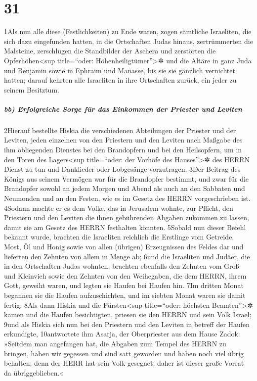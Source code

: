 \hypertarget{section-30}{%
\section{31}\label{section-30}}

1Als nun alle diese (Festlichkeiten) zu Ende waren, zogen sämtliche
Israeliten, die sich dazu eingefunden hatten, in die Ortschaften Judas
hinaus, zertrümmerten die Malsteine, zerschlugen die Standbilder der
Aschera und zerstörten die Opferhöhen\textless sup title=``oder:
Höhenheiligtümer''\textgreater✲ und die Altäre in ganz Juda und Benjamin
sowie in Ephraim und Manasse, bis sie sie gänzlich vernichtet hatten;
darauf kehrten alle Israeliten in ihre Ortschaften zurück, ein jeder zu
seinem Besitztum.

\hypertarget{bb-erfolgreiche-sorge-fuxfcr-das-einkommen-der-priester-und-leviten}{%
\subparagraph{bb) Erfolgreiche Sorge für das Einkommen der Priester und
Leviten}\label{bb-erfolgreiche-sorge-fuxfcr-das-einkommen-der-priester-und-leviten}}

2Hierauf bestellte Hiskia die verschiedenen Abteilungen der Priester und
der Leviten, jeden einzelnen von den Priestern und den Leviten nach
Maßgabe des ihm obliegenden Dienstes bei den Brandopfern und bei den
Heilsopfern, um in den Toren des Lagers\textless sup title=``oder: der
Vorhöfe des Hauses''\textgreater✲ des HERRN Dienst zu tun und Danklieder
oder Lobgesänge vorzutragen. 3Der Beitrag des Königs aus seinem Vermögen
war für die Brandopfer bestimmt, und zwar für die Brandopfer sowohl an
jedem Morgen und Abend als auch an den Sabbaten und Neumonden und an den
Festen, wie es im Gesetz des HERRN vorgeschrieben ist. 4Sodann machte er
es dem Volke, das in Jerusalem wohnte, zur Pflicht, den Priestern und
den Leviten die ihnen gebührenden Abgaben zukommen zu lassen, damit sie
am Gesetz des HERRN festhalten könnten. 5Sobald nun dieser Befehl
bekannt wurde, brachten die Israeliten reichlich die Erstlinge vom
Getreide, Most, Öl und Honig sowie von allen (übrigen) Erzeugnissen des
Feldes dar und lieferten den Zehnten von allem in Menge ab; 6und die
Israeliten und Judäer, die in den Ortschaften Judas wohnten, brachten
ebenfalls den Zehnten vom Groß- und Kleinvieh sowie den Zehnten von den
Weihegaben, die dem HERRN, ihrem Gott, geweiht waren, und legten sie
Haufen bei Haufen hin. 7Im dritten Monat begannen sie die Haufen
aufzuschichten, und im siebten Monat waren sie damit fertig. 8Als dann
Hiskia und die Fürsten\textless sup title=``oder: höchsten
Beamten''\textgreater✲ kamen und die Haufen besichtigten, priesen sie
den HERRN und sein Volk Israel; 9und als Hiskia sich nun bei den
Priestern und den Leviten in betreff der Haufen erkundigte, 10antwortete
ihm Asarja, der Oberpriester aus dem Hause Zadok: »Seitdem man
angefangen hat, die Abgaben zum Tempel des HERRN zu bringen, haben wir
gegessen und sind satt geworden und haben noch viel übrig behalten; denn
der HERR hat sein Volk gesegnet; daher ist dieser große Vorrat da
übriggeblieben.«

